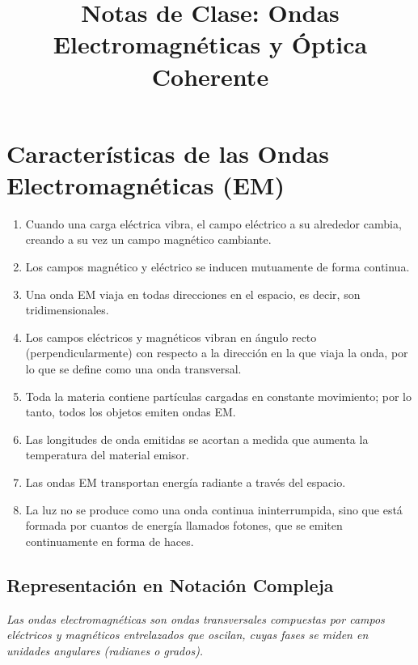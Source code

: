 \documentclass[12pt]{article}
\title{\textbf{Notas de Clase: Ondas Electromagnéticas y Óptica Coherente}}
\author{}
\date{}
\begin{document}
	
	\maketitle
	
	\section{Características de las Ondas Electromagnéticas (EM)}
	\begin{enumerate}
		\item Cuando una carga eléctrica vibra, el campo eléctrico a su alrededor cambia, creando a su vez un campo magnético cambiante.
		\item Los campos magnético y eléctrico se inducen mutuamente de forma continua.
		\item Una onda EM viaja en todas direcciones en el espacio, es decir, son tridimensionales.
		\item Los campos eléctricos y magnéticos vibran en ángulo recto (perpendicularmente) con respecto a la dirección en la que viaja la onda, por lo que se define como una onda transversal.
		\item Toda la materia contiene partículas cargadas en constante movimiento; por lo tanto, todos los objetos emiten ondas EM.
		\item Las longitudes de onda emitidas se acortan a medida que aumenta la temperatura del material emisor.
		\item Las ondas EM transportan energía radiante a través del espacio.
		\item La luz no se produce como una onda continua ininterrumpida, sino que está formada por cuantos de energía llamados fotones, que se emiten continuamente en forma de haces.
	\end{enumerate}
	
	\subsection{Representación en Notación Compleja}
	\textit{Las ondas electromagnéticas son ondas transversales compuestas por campos eléctricos y magnéticos entrelazados que oscilan, cuyas fases se miden en unidades angulares (radianes o grados).}
	
\end{document}
